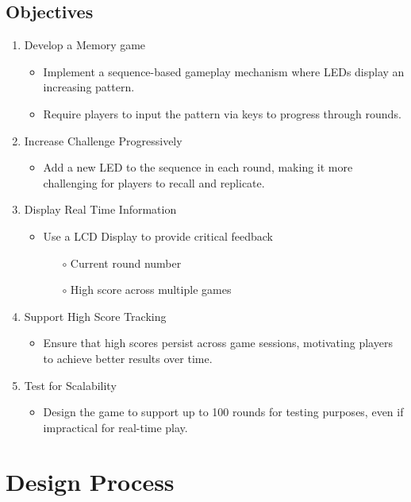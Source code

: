 \documentclass{report}
\begin{document}
\section{Objectives}
\begin{enumerate}
    \item Develop a Memory game
    \begin{itemize}
        \item Implement a sequence-based gameplay mechanism where LEDs display an increasing pattern.
        \item Require players to input the pattern via keys to progress through rounds.
    \end{itemize}
    \item  Increase Challenge Progressively
    \begin{itemize}
        \item Add a new LED to the sequence in each round, making it more challenging for players to recall and replicate.
    \end{itemize}
    \item Display Real Time Information
    \begin{itemize}
        \item Use a LCD Display to provide critical feedback
        \begin{itemize}
        \item[$\circ$] Current round number
        \item[$\circ$] High score across multiple games 
        \end{itemize}
    \end{itemize}
    \item Support High Score Tracking
    \begin{itemize}
        \item Ensure that high scores persist across game sessions, motivating players to achieve better results over time.
    \end{itemize}
    \item Test for Scalability
    \begin{itemize}
        \item Design the game to support up to 100 rounds for testing purposes, even if impractical for real-time play.
    \end{itemize}
\end{enumerate}

\chapter{Design Process}
\end{document}
